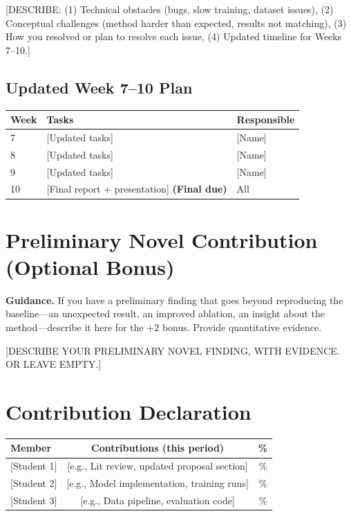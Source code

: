 \documentclass[11pt, letterpaper]{article}
\begin{document}
[DESCRIBE: (1) Technical obstacles (bugs, slow training, dataset issues),
(2) Conceptual challenges (method harder than expected, results not matching),
(3) How you resolved or plan to resolve each issue,
(4) Updated timeline for Weeks 7--10.]

\subsection{Updated Week 7--10 Plan}

\begin{tabular}{lp{8cm}l}
\toprule
\textbf{Week} & \textbf{Tasks} & \textbf{Responsible} \\
\midrule
7 & [Updated tasks] & [Name] \\
8 & [Updated tasks] & [Name] \\
9 & [Updated tasks] & [Name] \\
10 & [Final report + presentation] \textbf{(Final due)} & All \\
\bottomrule
\end{tabular}

\section{Preliminary Novel Contribution (Optional Bonus)}

\begin{guidancebox}
\textbf{Guidance.} If you have a preliminary finding that goes beyond
reproducing the baseline---an unexpected result, an improved ablation,
an insight about the method---describe it here for the +2 bonus.
Provide quantitative evidence.
\end{guidancebox}

[DESCRIBE YOUR PRELIMINARY NOVEL FINDING, WITH EVIDENCE. OR LEAVE EMPTY.]

\section{Contribution Declaration}

\begin{tabular}{lcc}
\toprule
\textbf{Member} & \textbf{Contributions (this period)} & \textbf{\%} \\
\midrule
{[Student 1]} & [e.g., Lit review, updated proposal section] & \% \\
{[Student 2]} & [e.g., Model implementation, training runs] & \% \\
{[Student 3] }& [e.g., Data pipeline, evaluation code] & \% \\
\bottomrule
\end{tabular}
\end{document}
